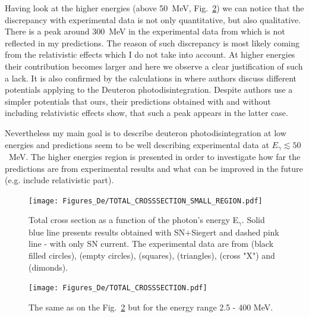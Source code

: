     Having look at the higher energies (above 50~MeV, Fig.~\ref{TOTAL_CROSS})
    we can notice that the discrepancy with experimental data is not only 
    quantitative, but also qualitative.  There is a peak around 300~MeV
    in the experimental data from \cite{Bernabei1986} which is not
    reflected in my predictions. The reason of such discrepancy 
    is most likely coming from the relativistic effects
    which I do not take into account. At higher energies their contribution
    becomes larger and here we observe a clear justification of such a lack.
    It is also confirmed by the calculations in \cite{ArenhovelPhotodisint1991}
    where authors discuss different potentials applying to the Deuteron photodisintegration.
    Despite authors use a simpler potentials that ours, their predictions obtained with and without including
    relativistic effects show, that such a peak appears in the latter case. 
    
    Nevertheless my main goal is to describe deuteron photodisintegration at low energies and predictions seem to be well describing experimental data at
    $E_\gamma \lesssim 50$~MeV. The higher energies region is presented in order
    to investigate how far the predictions are from experimental results and 
    what can be improved in the future (e.g. include relativistic part). 
    
    \begin{figure}[h]
        \begin{center}
        \texttt{[image: Figures\_De/TOTAL\_CROSSSECTION\_SMALL\_REGION.pdf]}
        \end{center}
        \caption{Total cross section as a function of the photon's energy E$_\gamma$.
        Solid blue line presents results obtained with SN+Siegert 
        and dashed pink line - with only SN current.
        The experimental data are from \cite{Bernabei1986} (black filled circles),
        \cite{BOSMAN1979} (empty circles),
        \cite{ARENDS1984} (squares),
        \cite{Skopik1974} (triangles),
        \cite{Moreh1989} (cross "X") and
        \cite{Birenbaum1985} (dimonds).
        }
        \label{}
    \end{figure}

    
    \begin{figure}[h]
        \begin{center}
        \texttt{[image: Figures\_De/TOTAL\_CROSSSECTION.pdf]}
        \end{center}
        \caption{The same as on the Fig.~\ref{TOTAL_CROSS} but for the energy range 2.5 - 400 MeV.
        }
        \label{TOTAL_CROSS}
    \end{figure}
    
